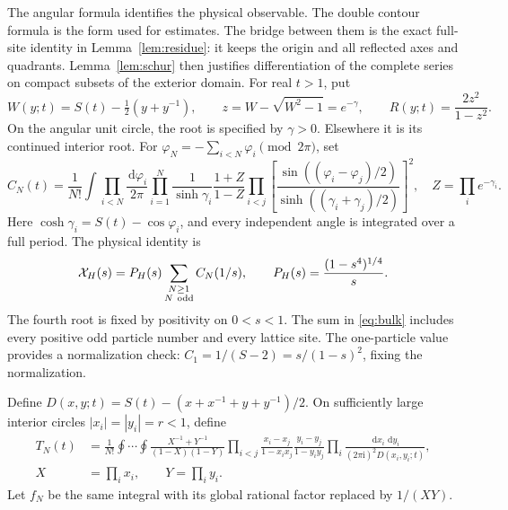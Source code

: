 \documentclass[11pt]{article}
\numberwithin{equation}{section}
\theoremstyle{definition}
\newcommand{\dd}{\,\mathrm d}
\newcommand{\ii}{\mathrm i}
\begin{document}
The angular formula identifies the physical observable. The double
contour formula is the form used for estimates. The bridge between them
is the exact full-site identity in Lemma~\ref{lem:residue}: it keeps the
origin and all reflected axes and quadrants. Lemma~\ref{lem:schur} then
justifies differentiation of the complete series on compact subsets of
the exterior domain.
For real $t>1$, put
\[
 W(y;t)=S(t)-\tfrac12(y+y^{-1}),\qquad
 z=W-\sqrt{W^2-1}=e^{-\gamma},\qquad
 R(y;t)=\frac{2z^2}{1-z^2}.
\]
On the angular unit circle, the root is specified by $\gamma>0$.
Elsewhere it is its continued interior root. For
$\varphi_N=-\sum_{i<N}\varphi_i\pmod{2\pi}$, set
\begin{equation}
 C_N(t)=\frac1{N!}\int\prod_{i<N}\frac{\dd\varphi_i}{2\pi}
 \prod_{i=1}^N\frac1{\sinh\gamma_i}
 \frac{1+Z}{1-Z}
 \prod_{i<j}\left[
 \frac{\sin((\varphi_i-\varphi_j)/2)}
      {\sinh((\gamma_i+\gamma_j)/2)}\right]^2,
 \quad Z=\prod_i e^{-\gamma_i}.
 \label{eq:angular}
\end{equation}
Here $\cosh\gamma_i=S(t)-\cos\varphi_i$, and every independent
angle is integrated over a full period. The physical identity is
\begin{equation}
 \mathcal X_H(s)=P_H(s)\sum_{\substack{N\ge1\\N\ {\rm odd}}}C_N(1/s),
 \qquad P_H(s)=\frac{(1-s^4)^{1/4}}s.
 \label{eq:bulk}
\end{equation}
The fourth root is fixed by positivity on $0<s<1$. The sum in
\eqref{eq:bulk} includes every positive odd particle number and every
lattice site. The one-particle value provides a normalization check:
$C_1=1/(S-2)=s/(1-s)^2$, fixing the normalization.

Define $D(x,y;t)=S(t)-(x+x^{-1}+y+y^{-1})/2$. On sufficiently
large interior circles $|x_i|=|y_i|=r<1$, define
\begin{align}
 T_N(t)&=\frac1{N!}\oint\cdots\oint
 \frac{X^{-1}+Y^{-1}}{(1-X)(1-Y)}
 \prod_{i<j}\frac{x_i-x_j}{1-x_ix_j}\frac{y_i-y_j}{1-y_iy_j}
 \prod_i\frac{\dd x_i\,\dd y_i}{(2\pi\ii)^2D(x_i,y_i;t)},
 \label{eq:double}\\
 X&=\prod_i x_i,\qquad Y=\prod_i y_i.\nonumber
\end{align}
Let $f_N$ be the same integral with its global rational factor
replaced by $1/(XY)$.
\end{document}
